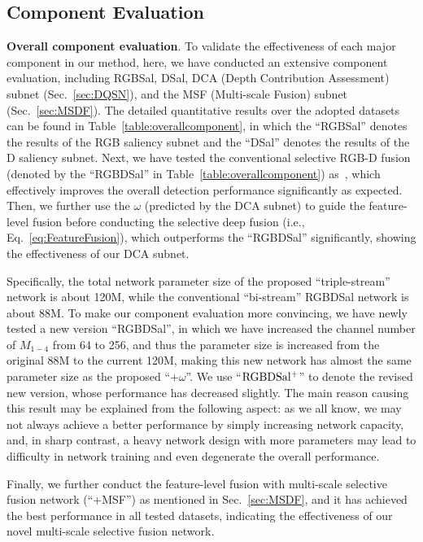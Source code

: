 \documentclass[journal]{IEEEtran}
\begin{document}
\subsection{Component Evaluation}
\textbf{Overall component evaluation}.
To validate the effectiveness of each major component in our method, here, we have conducted an extensive component evaluation, including RGBSal, DSal, DCA (Depth Contribution Assessment) subnet (Sec.~\ref{sec:DQSN}), and the MSF (Multi-scale Fusion) subnet (Sec.~\ref{sec:MSDF}).
The detailed quantitative results over the adopted datasets can be found in Table~\ref{table:overallcomponent}, in which the ``RGBSal'' denotes the results of the RGB saliency subnet and the ``DSal'' denotes the results of the D saliency subnet.
Next, we have tested the conventional selective RGB-D fusion (denoted by the ``RGBDSal'' in Table~\ref{table:overallcomponent}) as~\cite{Zhu2018PDNet}, which effectively improves the overall detection performance significantly as expected.
Then, we further use the $\omega$ (predicted by the DCA subnet) to guide the feature-level fusion before conducting the selective deep fusion (i.e., Eq.~\ref{eq:FeatureFusion}), which outperforms the ``RGBDSal'' significantly, showing the effectiveness of our DCA subnet.

Specifically, the total network parameter size of the proposed ``triple-stream'' network is about 120M, while the conventional ``bi-stream'' RGBDSal network is about 88M.
To make our component evaluation more convincing, we have newly tested a new version ``RGBDSal'', in which we have increased the channel number of $M_{1-4}$ from 64 to 256, and thus the parameter size is increased from the original 88M to the current 120M, making this new network has almost the same parameter size as the proposed ``$+\omega$''.
We use ``$\rm RGBDSal^+$'' to denote the revised new version, whose performance has decreased slightly.
The main reason causing this result may be explained from the following aspect: as we all know, we may not always achieve a better performance by simply increasing network capacity, and, in sharp contrast, a heavy network design with more parameters may lead to difficulty in network training and even degenerate the overall performance.

Finally, we further conduct the feature-level fusion with multi-scale selective fusion network (``+MSF'') as mentioned in Sec.~\ref{sec:MSDF}, and it has achieved the best performance in all tested datasets, indicating the effectiveness of our novel multi-scale selective fusion network.
\end{document}
